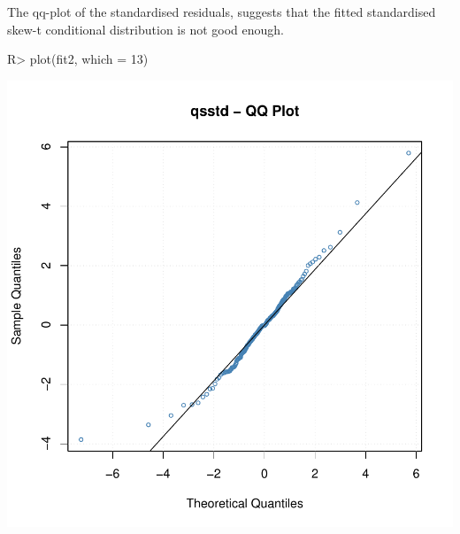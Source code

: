 \documentclass[article,nojss]{jss}
\begin{document}
The qq-plot of the standardised residuals, suggests that the fitted standardised skew-t
conditional distribution is not good enough.
\begin{Schunk}
\begin{Sinput}
R> plot(fit2, which = 13)
\end{Sinput}
\end{Schunk}
\includegraphics{garch_tests_example-012}
\end{document}
